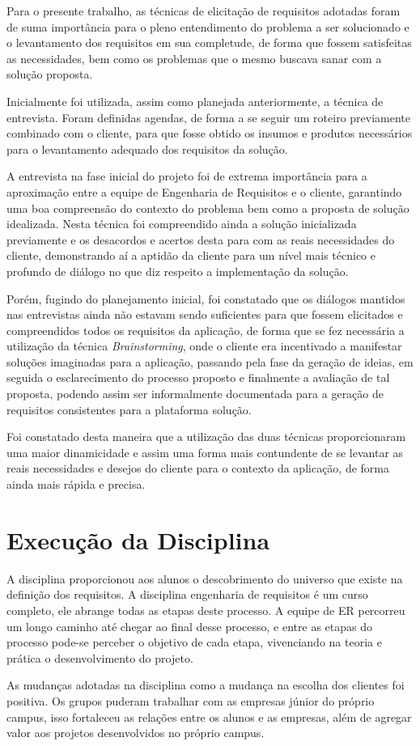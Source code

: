 Para o presente trabalho, as técnicas de elicitação de requisitos adotadas foram de suma importância para o pleno entendimento do problema a ser solucionado e o levantamento dos requisitos em sua completude, de forma que fossem satisfeitas as necessidades, bem como os problemas que o mesmo buscava sanar com a solução proposta.

Inicialmente foi utilizada, assim como planejada anteriormente, a técnica de entrevista. Foram definidas agendas, de forma a se seguir um roteiro previamente combinado com o cliente, para que fosse obtido os insumos e produtos necessários para o levantamento adequado dos requisitos da solução.

A entrevista na fase inicial do projeto foi de extrema importância para a aproximação entre a equipe de Engenharia de Requisitos e o cliente, garantindo uma boa compreensão do contexto do problema bem como a proposta de solução idealizada. Nesta técnica foi compreendido ainda a solução inicializada previamente e os desacordos e acertos desta para com as reais necessidades do cliente, demonstrando aí a aptidão da cliente para um nível mais técnico e profundo de diálogo no que diz respeito a implementação da solução.

Porém, fugindo do planejamento inicial, foi constatado que os diálogos mantidos nas entrevistas ainda não estavam sendo suficientes para que fossem elicitados e compreendidos todos os requisitos da aplicação, de forma que se fez necessária a utilização da técnica \textit{Brainstorming}, onde o cliente era incentivado a manifestar soluções imaginadas para a aplicação, passando pela fase da geração de ideias, em seguida o esclarecimento do processo proposto e finalmente a avaliação de tal proposta, podendo assim ser informalmente documentada para a geração de requisitos consistentes para a plataforma solução.

Foi constatado desta maneira que a utilização das duas técnicas proporcionaram uma maior dinamicidade e assim uma forma mais contundente de se levantar as reais necessidades e desejos do cliente para o contexto da aplicação, de forma ainda mais rápida e precisa.

\section{Execução da Disciplina}

A disciplina proporcionou aos alunos o descobrimento do universo que existe na definição dos requisitos. A disciplina  engenharia de requisitos é um curso completo, ele abrange todas as etapas deste processo. A equipe de ER percorreu um longo caminho até chegar ao final desse processo, e entre as etapas do processo pode-se perceber o objetivo de cada etapa, vivenciando na teoria e prática o desenvolvimento do projeto.

As mudanças adotadas na disciplina como a mudança na escolha dos clientes foi positiva. Os grupos puderam trabalhar com as empresas júnior do próprio campus, isso fortaleceu as relações entre os alunos e as empresas, além de agregar valor aos projetos desenvolvidos no próprio campus.
